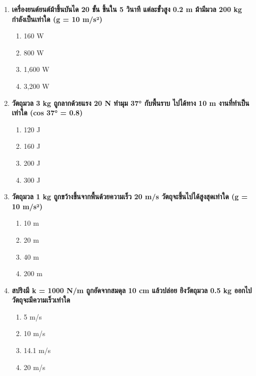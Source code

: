 \documentclass[12pt]{article}
\begin{document}
\begin{enumerate}
\begin{enumerate}[label=\alph*)]
\item 400 kJ
\item 800 kJ
\end{enumerate}
\item \textbf{เครื่องยนต์ยนต์ม้าขึ้นบันได 20 ขั้น ขึ้นใน 5 วินาที แต่ละขั้วสูง 0.2 m ม้ามีมวล 200 kg กำลังเป็นเท่าใด (g = 10 m/s²)}
\begin{enumerate}[label=\alph*)]
\item 160 W
\item 800 W
\item 1,600 W
\item 3,200 W
\end{enumerate}
\item \textbf{วัตถุมวล 3 kg ถูกลากด้วยแรง 20 N ทำมุม 37° กับพื้นราบ ไปได้ทาง 10 m งานที่ทำเป็นเท่าใด (cos 37° = 0.8)}
\begin{enumerate}[label=\alph*)]
\item 120 J
\item 160 J
\item 200 J
\item 300 J
\end{enumerate}
\item \textbf{วัตถุมวล 1 kg ถูกขว้างขึ้นจากพื้นด้วยความเร็ว 20 m/s วัตถุจะขึ้นไปได้สูงสุดเท่าใด (g = 10 m/s²)}
\begin{enumerate}[label=\alph*)]
\item 10 m
\item 20 m
\item 40 m
\item 200 m
\end{enumerate}
\item \textbf{สปริงมี k = 1000 N/m ถูกอัดจากสมดุล 10 cm แล้วปล่อย ยิงวัตถุมวล 0.5 kg ออกไป วัตถุจะมีความเร็วเท่าใด}
\begin{enumerate}[label=\alph*)]
\item 5 m/s
\item 10 m/s
\item 14.1 m/s
\item 20 m/s
\end{enumerate}
\end{enumerate}
\end{document}

